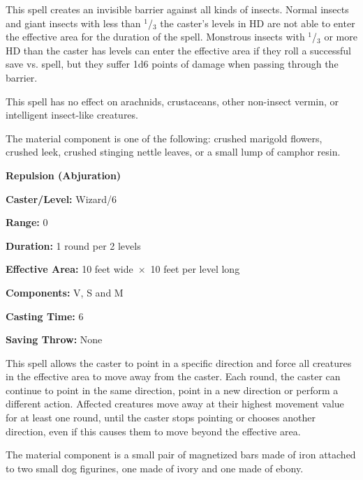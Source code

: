 \begin{multicols}{2}
This spell creates an invisible barrier against all kinds of insects.  Normal insects and giant insects with less than $^1$/$_3$ the caster's levels in HD are not able to enter the effective area for the duration of the spell.  Monstrous insects with $^1$/$_3$ or more HD than the caster has levels can enter the effective area if they roll a successful save vs. spell, but they suffer 1d6 points of damage when passing through the barrier.  

This spell has no effect on arachnids, crustaceans, other non-insect vermin, or intelligent insect-like creatures.

The material component is one of the following: crushed marigold flowers, crushed leek, crushed stinging nettle leaves, or a small lump of camphor resin.

\vspace{1em}

\noindent
\begin{minipage}{\columnwidth}

\noindent \textbf{Repulsion (Abjuration)}

\noindent \textbf{Caster/Level:} Wizard/6

\noindent \textbf{Range:} 0

\noindent \textbf{Duration:} 1 round per 2 levels

\noindent \textbf{Effective Area:} 10 feet wide~$\times$~10 feet per level long

\noindent \textbf{Components:} V, S and M

\noindent \textbf{Casting Time:} 6

\noindent \textbf{Saving Throw:} None

\end{minipage}

This spell allows the caster to point in a specific direction and force all creatures in the effective area to move away from the caster.  Each round, the caster can continue to point in the same direction, point in a new direction or perform a different action.  Affected creatures move away at their highest movement value for at least one round, until the caster stops pointing or chooses another direction, even if this causes them to move beyond the effective area.

The material component is a small pair of magnetized bars made of iron attached to two small dog figurines, one made of ivory and one made of ebony.

\vspace{1em}


\end{multicols}
